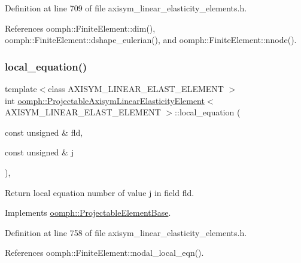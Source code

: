 Definition at line 709 of file axisym\+\_\+linear\+\_\+elasticity\+\_\+elements.\+h.



References oomph\+::\+Finite\+Element\+::dim(), oomph\+::\+Finite\+Element\+::dshape\+\_\+eulerian(), and oomph\+::\+Finite\+Element\+::nnode().

\mbox{\label{classoomph_1_1ProjectableAxisymLinearElasticityElement_a449c2dd77bc7f66fac46affb6223a04b}} 
\subsubsection{\texorpdfstring{local\+\_\+equation()}{local\_equation()}}
{\footnotesize\ttfamily template$<$class A\+X\+I\+S\+Y\+M\+\_\+\+L\+I\+N\+E\+A\+R\+\_\+\+E\+L\+A\+S\+T\+\_\+\+E\+L\+E\+M\+E\+NT $>$ \\
int \hyperlink{classoomph_1_1ProjectableAxisymLinearElasticityElement}{oomph\+::\+Projectable\+Axisym\+Linear\+Elasticity\+Element}$<$ A\+X\+I\+S\+Y\+M\+\_\+\+L\+I\+N\+E\+A\+R\+\_\+\+E\+L\+A\+S\+T\+\_\+\+E\+L\+E\+M\+E\+NT $>$\+::local\+\_\+equation (\begin{DoxyParamCaption}\item[{const unsigned \&}]{fld,  }\item[{const unsigned \&}]{j }\end{DoxyParamCaption})\hspace{0.3cm}{\ttfamily [inline]}, {\ttfamily [virtual]}}



Return local equation number of value j in field fld. 



Implements \hyperlink{classoomph_1_1ProjectableElementBase_ac5c27ae929ff636dc7747fe23fd4f738}{oomph\+::\+Projectable\+Element\+Base}.



Definition at line 758 of file axisym\+\_\+linear\+\_\+elasticity\+\_\+elements.\+h.



References oomph\+::\+Finite\+Element\+::nodal\+\_\+local\+\_\+eqn().

